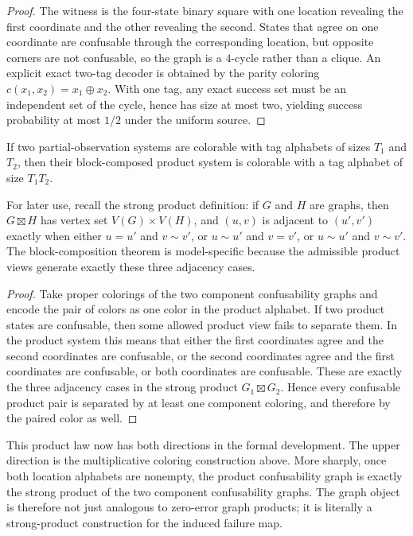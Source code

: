 \begin{proof}
The witness is the four-state binary square with one location revealing the first coordinate and the other revealing the second. States that agree on one coordinate are confusable through the corresponding location, but opposite corners are not confusable, so the graph is a $4$-cycle rather than a clique. An explicit exact two-tag decoder is obtained by the parity coloring $c(x_1,x_2)=x_1\oplus x_2$. With one tag, any exact success set must be an independent set of the cycle, hence has size at most two, yielding success probability at most $1/2$ under the uniform source.
\end{proof}

\begin{theorem}\label{thm:multifact-product}
If two partial-observation systems are colorable with tag alphabets of sizes $T_1$ and $T_2$, then their block-composed product system is colorable with a tag alphabet of size $T_1T_2$.
\end{theorem}

For later use, recall the strong product definition: if $G$ and $H$ are graphs, then $G\boxtimes H$ has vertex set $V(G)\times V(H)$, and $(u,v)$ is adjacent to $(u',v')$ exactly when either $u=u'$ and $v\sim v'$, or $u\sim u'$ and $v=v'$, or $u\sim u'$ and $v\sim v'$. The block-composition theorem is model-specific because the admissible product views generate exactly these three adjacency cases.

\begin{proof}
Take proper colorings of the two component confusability graphs and encode the pair of colors as one color in the product alphabet. If two product states are confusable, then some allowed product view fails to separate them. In the product system this means that either the first coordinates agree and the second coordinates are confusable, or the second coordinates agree and the first coordinates are confusable, or both coordinates are confusable. These are exactly the three adjacency cases in the strong product $G_1\boxtimes G_2$. Hence every confusable product pair is separated by at least one component coloring, and therefore by the paired color as well.
\end{proof}

This product law now has both directions in the formal development. The upper direction is the multiplicative coloring construction above. More sharply, once both location alphabets are nonempty, the product confusability graph is exactly the strong product of the two component confusability graphs. The graph object is therefore not just analogous to zero-error graph products; it is literally a strong-product construction for the induced failure map. 

